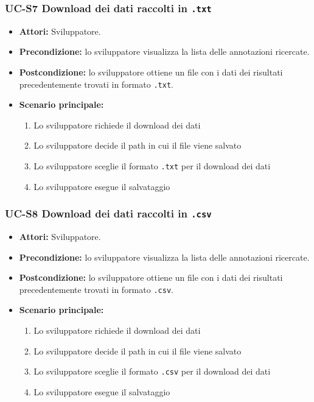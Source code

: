 \subsubsection{UC-S7 Download dei dati raccolti in \texttt{.txt}}
		\begin{itemize}
			\item \textbf{Attori:} Sviluppatore.
			\item \textbf{Precondizione:} lo sviluppatore visualizza la lista delle annotazioni ricercate.
			\item \textbf{Postcondizione:} lo sviluppatore ottiene un file con i dati dei risultati precedentemente trovati in formato \texttt{.txt}.
			\item \textbf{Scenario principale:}
				\begin{enumerate}
					\item Lo sviluppatore richiede il download dei dati
					\item Lo sviluppatore decide il path in cui il file viene salvato
					\item Lo sviluppatore sceglie il formato \texttt{.txt} per il download dei dati
					\item Lo sviluppatore esegue il salvataggio
				\end{enumerate}
		\end{itemize}

\subsubsection{UC-S8 Download dei dati raccolti in \texttt{.csv}}
		\begin{itemize}
			\item \textbf{Attori:} Sviluppatore.
			\item \textbf{Precondizione:} lo sviluppatore visualizza la lista delle annotazioni ricercate.
			\item \textbf{Postcondizione:} lo sviluppatore ottiene un file con i dati dei risultati precedentemente trovati in formato \texttt{.csv}.
			\item \textbf{Scenario principale:}
				\begin{enumerate}
					\item Lo sviluppatore richiede il download dei dati
					\item Lo sviluppatore decide il path in cui il file viene salvato
					\item Lo sviluppatore sceglie il formato \texttt{.csv} per il download dei dati
					\item Lo sviluppatore esegue il salvataggio
				\end{enumerate}
		\end{itemize}

